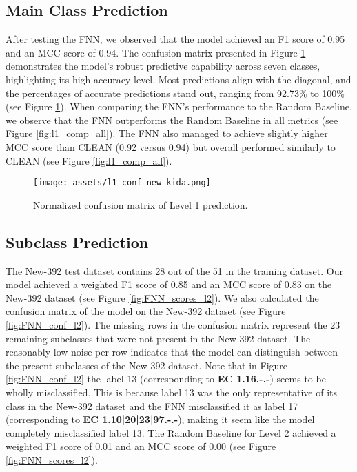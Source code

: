 \documentclass{bioinfo}
\begin{document}

\subsection{Main Class Prediction}
After testing the FNN, we observed that the model achieved an F1 score of 0.95 and an MCC score of 0.94. 
The confusion matrix presented in Figure \ref{fig:FNN_conf_l1} demonstrates the model's robust predictive capability across seven classes, 
highlighting its high accuracy level. Most predictions align with the diagonal, and the percentages of accurate predictions stand out, 
ranging from 92.73\% to 100\% (see Figure \ref{fig:FNN_conf_l1}).
When comparing the FNN's performance to the Random Baseline, we observe that the FNN outperforms the Random Baseline in all metrics (see Figure \ref{fig:l1_comp_all}).
The FNN also managed to achieve slightly higher MCC score than CLEAN (0.92 versus 0.94) but overall performed similarly to CLEAN (see Figure \ref{fig:l1_comp_all}).

\begin{figure}[!ht]
\texttt{[image: assets/l1\_conf\_new\_kida.png]}
\caption{Normalized confusion matrix of Level 1 prediction.}\label{fig:FNN_conf_l1}
\end{figure}

\subsection{Subclass Prediction}
The New-392 test dataset contains 28 out of the 51 in the training dataset.
Our model achieved a weighted F1 score of 0.85 and an MCC score of 0.83 on the New-392 dataset (see Figure \ref{fig:FNN_scores_l2}).
We also calculated the confusion matrix of the model on the New-392 dataset (see Figure \ref{fig:FNN_conf_l2}).
The missing rows in the confusion matrix represent the 23 remaining subclasses that were not present in the New-392 dataset.
The reasonably low noise per row indicates that the model can distinguish between the present subclasses of the New-392 dataset.
Note that in Figure \ref{fig:FNN_conf_l2} the label 13 (corresponding to \textbf{EC 1.16.-.-}) seems to be wholly misclassified.
This is because label 13 was the only representative of its class in the New-392 dataset and
the FNN misclassified it as label 17 (corresponding to \textbf{EC 1.10|20|23|97.-.-}), making it seem like the model completely misclassified label 13.
The Random Baseline for Level 2 achieved a weighted F1 score of 0.01 and an MCC score of 0.00 (see Figure \ref{fig:FNN_scores_l2}).
\end{document}
